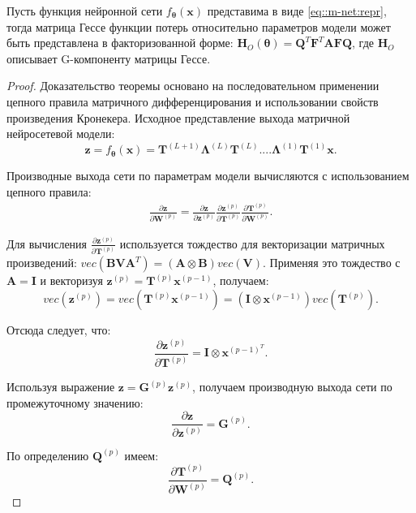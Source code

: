 \begin{theorem}\label{theorem:m-net:hesstruct}
    Пусть функция нейронной сети $f_{\boldsymbol{\theta}}(\mathbf{x})$ представима в виде \eqref{eq::m-net:repr}, тогда матрица Гессе функции потерь относительно параметров модели может быть представлена в факторизованной форме:
    $\mathbf{H}_O(\boldsymbol{\theta}) = \mathbf{Q}^{T}\mathbf{F}^{T}\mathbf{A}\mathbf{F}\mathbf{Q}$, где $\mathbf{H}_O$ описывает G-компоненту матрицы Гессе.
\end{theorem}
\begin{proof}
Доказательство теоремы основано на последовательном применении цепного правила матричного дифференцирования и использовании свойств произведения Кронекера.
Исходное представление выхода матричной нейросетевой модели:
\[
    \mathbf{z} = f_{\boldsymbol{\theta}}(\mathbf{x}) = \mathbf{T}^{(L+1)}\boldsymbol{\Lambda}^{(L)}\mathbf{T}^{(L)}....\boldsymbol{\Lambda}^{(1)}\mathbf{T}^{(1)}\mathbf{x}.
\]

Производные выхода сети по параметрам модели вычисляются с использованием цепного правила:
\begin{align}
 \frac{\partial\mathbf{z}}{\partial\mathbf{W}^{(p)}} = \frac{\partial\mathbf{z}}{\partial\mathbf{z}^{(p)}} \frac{\partial\mathbf{z}^{(p)}}{\partial\mathbf{T}^{(p)}} \frac{\partial\mathbf{T}^{(p)}}{\partial\mathbf{W}^{(p)}}.
\end{align}

Для вычисления $\frac{\partial\mathbf{z}^{(p)}}{\partial\mathbf{T}^{(p)}}$ используется тождество для векторизации матричных произведений: $vec(\mathbf{B}\mathbf{V}\mathbf{A}^T) = (\mathbf{A} \otimes \mathbf{B})vec(\mathbf{V})$.
Применяя это тождество с $\mathbf{A} = \mathbf{I}$ и векторизуя $\mathbf{z}^{(p)} = \mathbf{T}^{(p)}\mathbf{x}^{(p-1)}$, получаем:
\[
    vec(\mathbf{z}^{(p)}) = vec(\mathbf{T}^{(p)}\mathbf{x}^{(p-1)}) = (\mathbf{I} \otimes \mathbf{x}^{(p-1)})vec(\mathbf{T}^{(p)}).
\]

Отсюда следует, что:
\[
    \frac{\partial \mathbf{z}^{(p)}}{\partial \mathbf{T}^{(p)}} = \mathbf{I} \otimes \mathbf{x}^{(p-1)^T}.
\]

Используя выражение $\mathbf{z} = \mathbf{G}^{(p)}\mathbf{z}^{(p)}$, получаем производную выхода сети по промежуточному значению:
\[
    \frac{\partial \mathbf{z}}{\partial \mathbf{z}^{(p)}} = \mathbf{G}^{(p)}.
\]

По определению $\mathbf{Q}^{(p)}$ имеем:
\[
    \frac{\partial\mathbf{T}^{(p)}}{\partial\mathbf{W}^{(p)}} = {\mathbf{Q}}^{(p)}.
\]


\end{proof}
